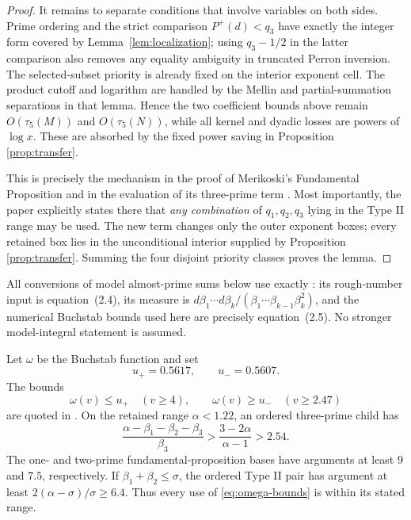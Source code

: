 \documentclass[10pt,reqno]{amsart}
\newcommand{\1}{\mathbf{1}}
\theoremstyle{plain}
\theoremstyle{remark}
\begin{document}
\begin{proof}
It remains to separate conditions that involve variables on both sides.
Prime ordering and the strict comparison $P^+(d)<q_3$ have exactly the
integer form covered by Lemma~\ref{lem:localization}; using $q_3-1/2$ in
the latter comparison also removes any equality ambiguity in truncated
Perron inversion.  The selected-subset priority is already fixed on the
interior exponent cell.  The product cutoff and logarithm are handled by
the Mellin and partial-summation separations in that lemma.  Hence the two
coefficient bounds above remain $O(\tau_5(M))$ and
$O(\tau_5(N))$, while all kernel and dyadic losses are powers of
$\log x$.  These are absorbed by the fixed power saving in Proposition
\ref{prop:transfer}.

This is precisely the mechanism in the proof of Merikoski's Fundamental
Proposition and in the evaluation of its three-prime term
\cite[Sections 2.3, 2.4.3, and 3.4]{Merikoski2020}.  Most importantly, the
paper explicitly states there that \emph{any combination} of
$q_1,q_2,q_3$ lying in the Type II range may be used.  The new term changes
only the outer exponent boxes; every retained box lies in the unconditional
interior supplied by Proposition \ref{prop:transfer}.  Summing the four
disjoint priority classes proves the lemma.
\end{proof}

All conversions of model almost-prime sums below use exactly
\cite[Lemma 7]{Merikoski2020}: its rough-number input is equation~(2.4), its
measure is $d\beta_1\cdots d\beta_k/(\beta_1\cdots\beta_{k-1}\beta_k^2)$,
and the numerical Buchstab bounds used here are precisely equation~(2.5).
No stronger model-integral statement is assumed.

Let $\omega$ be the Buchstab function and set
\[
  u_+=0.5617,\qquad u_-=0.5607.
\]
The bounds
\begin{equation}\label{eq:omega-bounds}
  \omega(v)\le u_+\quad(v\ge4),\qquad
  \omega(v)\ge u_-\quad(v\ge2.47)
\end{equation}
are quoted in \cite[(2.5)]{Merikoski2020}.  On the retained range
$\alpha<1.22$, an ordered three-prime child has
\[
 \frac{\alpha-\beta_1-\beta_2-\beta_3}{\beta_3}
 >\frac{3-2\alpha}{\alpha-1}>2.54.
\]
The one- and two-prime fundamental-proposition bases have arguments at
least $9$ and $7.5$, respectively.  If $\beta_1+\beta_2\le\sigma$, the
ordered Type II pair has argument at least
$2(\alpha-\sigma)/\sigma\ge6.4$.  Thus every use of
\eqref{eq:omega-bounds} is within its stated range.
\end{document}
